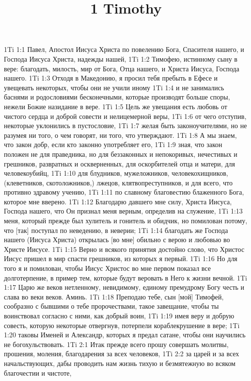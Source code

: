 

\title{1 Timothy}

1Ti 1:1  Павел, Апостол Иисуса Христа по повелению Бога, Спасителя нашего, и Господа Иисуса Христа, надежды нашей,
1Ti 1:2  Тимофею, истинному сыну в вере: благодать, милость, мир от Бога, Отца нашего, и Христа Иисуса, Господа нашего.
1Ti 1:3  Отходя в Македонию, я просил тебя пребыть в Ефесе и увещевать некоторых, чтобы они не учили иному
1Ti 1:4  и не занимались баснями и родословиями бесконечными, которые производят больше споры, нежели Божие назидание в вере.
1Ti 1:5  Цель же увещания есть любовь от чистого сердца и доброй совести и нелицемерной веры,
1Ti 1:6  от чего отступив, некоторые уклонились в пустословие,
1Ti 1:7  желая быть законоучителями, но не разумея ни того, о чем говорят, ни того, что утверждают.
1Ti 1:8  А мы знаем, что закон добр, если кто законно употребляет его,
1Ti 1:9  зная, что закон положен не для праведника, но для беззаконных и непокоривых, нечестивых и грешников, развратных и оскверненных, для оскорбителей отца и матери, для человекоубийц,
1Ti 1:10  для блудников, мужеложников, человекохищников, (клеветников, скотоложников,) лжецов, клятвопреступников, и для всего, что противно здравому учению,
1Ti 1:11  по славному благовестию блаженного Бога, которое мне вверено.
1Ti 1:12  Благодарю давшего мне силу, Христа Иисуса, Господа нашего, что Он признал меня верным, определив на служение,
1Ti 1:13  меня, который прежде был хулитель и гонитель и обидчик, но помилован потому, что [так] поступал по неведению, в неверии;
1Ti 1:14  благодать же Господа нашего (Иисуса Христа) открылась [во мне] обильно с верою и любовью во Христе Иисусе.
1Ti 1:15  Верно и всякого принятия достойно слово, что Христос Иисус пришел в мир спасти грешников, из которых я первый.
1Ti 1:16  Но для того я и помилован, чтобы Иисус Христос во мне первом показал все долготерпение, в пример тем, которые будут веровать в Него к жизни вечной.
1Ti 1:17  Царю же веков нетленному, невидимому, единому премудрому Богу честь и слава во веки веков. Аминь.
1Ti 1:18  Преподаю тебе, сын [мой] Тимофей, сообразно с бывшими о тебе пророчествами, такое завещание, чтобы ты воинствовал согласно с ними, как добрый воин,
1Ti 1:19  имея веру и добрую совесть, которую некоторые отвергнув, потерпели кораблекрушение в вере;
1Ti 1:20  таковы Именей и Александр, которых я предал сатане, чтобы они научились не богохульствовать.
1Ti 2:1  Итак прежде всего прошу совершать молитвы, прошения, моления, благодарения за всех человеков,
1Ti 2:2  за царей и за всех начальствующих, дабы проводить нам жизнь тихую и безмятежную во всяком благочестии и чистоте,
